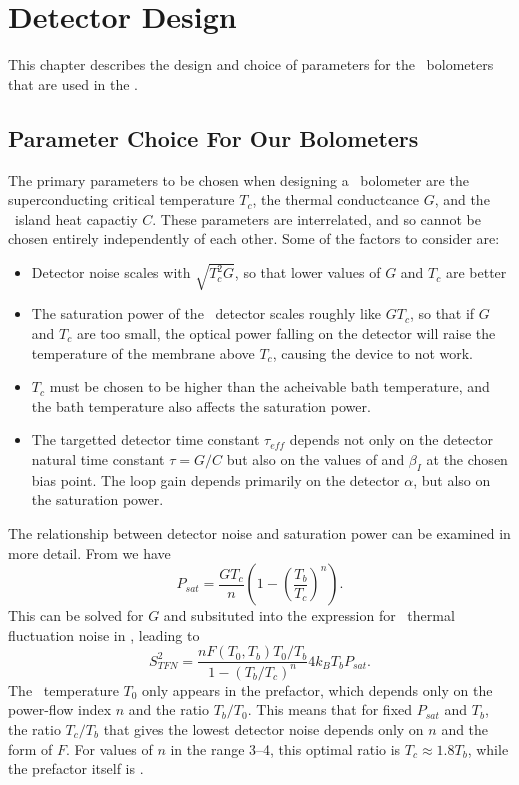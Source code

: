 \chapter{Detector Design}\label{c:det-design}

This chapter describes the design and choice of parameters for the \TES\ bolometers that are used in the \Imager.

\section{Parameter Choice For Our Bolometers} \label{sec:det-parm-choice}

The primary parameters to be chosen when designing a \TES\ bolometer are the superconducting critical temperature $T_c$, the thermal conductcance $G$, and the \TES\ island heat capactiy $C$.
These parameters are interrelated, and so cannot be chosen entirely independently of each other.
Some of the factors to consider are:
\begin{itemize}
  \item Detector noise scales with $\sqrt{T_c^2 G}$, so that lower values of $G$ and $T_c$ are better
  \item The saturation power of the \TES\ detector scales roughly like $G T_c$, so that if $G$ and $T_c$ are too small, the optical power falling on the detector will raise the temperature of the membrane above $T_c$, causing the device to not work.
  \item $T_c$ must be chosen to be higher than the acheivable bath temperature, and the bath temperature also affects the saturation power.
  \item The targetted detector time constant $\tau_{eff}$ depends not only on the detector natural time constant $\tau = G / C$ but also on the values of \Loop and $\beta_I$ at the chosen bias point.
        The loop gain depends primarily on the detector $\alpha$, but also on the saturation power.
\end{itemize}

The relationship between detector noise and saturation power can be examined in more detail.
From  we have
\begin{equation} \label{eqn:ch5-psat}
P_{sat} = \frac{G T_c}{n}\left(1 - \left(\frac{T_b}{T_c}\right)^n\right).
\end{equation}
This can be solved for $G$ and subsituted into the expression for \TES\ thermal fluctuation noise in , leading to
\begin{equation} \label{eqn:ch5-tes-noise}
S^2_{TFN} = \frac{n F(T_0, T_b) T_0 / T_b}{1-(T_b/T_c)^n} 4 k_B T_b P_{sat}.
\end{equation}
The \TES\ temperature $T_0$ only appears in the prefactor, which depends only on the power-flow index $n$ and the ratio $T_b/T_0$.
This means that for fixed $P_{sat}$ and $T_b$, the ratio $T_c/T_b$ that gives the lowest detector noise depends only on $n$ and the form of $F$.
For values of $n$ in the range 3--4, this optimal ratio is $T_c \approx 1.8 T_b$, while the prefactor itself is .

